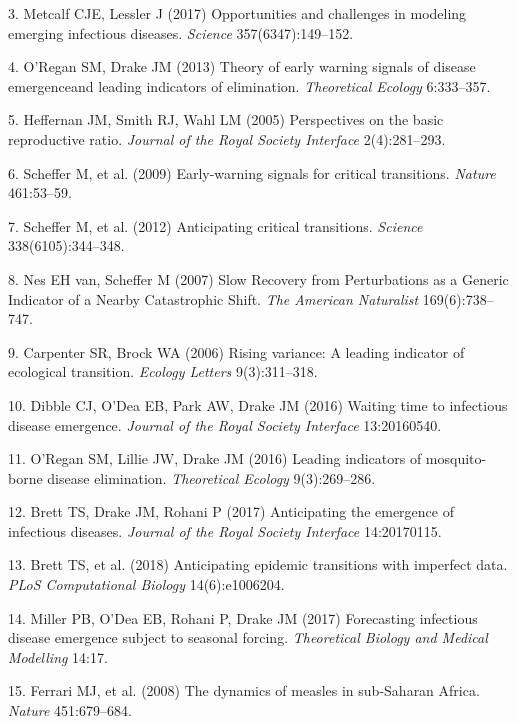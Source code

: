 \documentclass[3p]{elsarticle} %
\begin{document}
\hypertarget{ref-Metcalf2017}{}
3. Metcalf CJE, Lessler J (2017) Opportunities and challenges in
modeling emerging infectious diseases. \emph{Science}
357(6347):149--152.

\hypertarget{ref-ORegan2013}{}
4. O'Regan SM, Drake JM (2013) Theory of early warning signals of
disease emergenceand leading indicators of elimination.
\emph{Theoretical Ecology} 6:333--357.

\hypertarget{ref-Heffernan2005}{}
5. Heffernan JM, Smith RJ, Wahl LM (2005) Perspectives on the basic
reproductive ratio. \emph{Journal of the Royal Society Interface}
2(4):281--293.

\hypertarget{ref-Scheffer2009}{}
6. Scheffer M, et al. (2009) Early-warning signals for critical
transitions. \emph{Nature} 461:53--59.

\hypertarget{ref-Scheffer2012}{}
7. Scheffer M, et al. (2012) Anticipating critical transitions.
\emph{Science} 338(6105):344--348.

\hypertarget{ref-VanNes2007}{}
8. Nes EH van, Scheffer M (2007) Slow Recovery from Perturbations as a
Generic Indicator of a Nearby Catastrophic Shift. \emph{The American
Naturalist} 169(6):738--747.

\hypertarget{ref-Carpenter2006}{}
9. Carpenter SR, Brock WA (2006) Rising variance: A leading indicator of
ecological transition. \emph{Ecology Letters} 9(3):311--318.

\hypertarget{ref-Dibble2016}{}
10. Dibble CJ, O'Dea EB, Park AW, Drake JM (2016) Waiting time to
infectious disease emergence. \emph{Journal of the Royal Society
Interface} 13:20160540.

\hypertarget{ref-ORegan2016}{}
11. O'Regan SM, Lillie JW, Drake JM (2016) Leading indicators of
mosquito-borne disease elimination. \emph{Theoretical Ecology}
9(3):269--286.

\hypertarget{ref-Brett2017}{}
12. Brett TS, Drake JM, Rohani P (2017) Anticipating the emergence of
infectious diseases. \emph{Journal of the Royal Society Interface}
14:20170115.

\hypertarget{ref-Brett2018}{}
13. Brett TS, et al. (2018) Anticipating epidemic transitions with
imperfect data. \emph{PLoS Computational Biology} 14(6):e1006204.

\hypertarget{ref-Miller2017}{}
14. Miller PB, O'Dea EB, Rohani P, Drake JM (2017) Forecasting
infectious disease emergence subject to seasonal forcing.
\emph{Theoretical Biology and Medical Modelling} 14:17.

\hypertarget{ref-Ferrari2008}{}
15. Ferrari MJ, et al. (2008) The dynamics of measles in sub-Saharan
Africa. \emph{Nature} 451:679--684.
\end{document}
